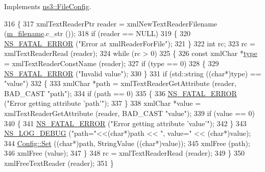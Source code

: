 Implements \hyperlink{classns3_1_1FileConfig_a2e56e049dfcc1c1378aca7e9cab58280}{ns3\+::\+File\+Config}.


\begin{DoxyCode}
316 \{
317   xmlTextReaderPtr reader = xmlNewTextReaderFilename (\hyperlink{classns3_1_1XmlConfigLoad_a8214344f421f9916919684829b0a129a}{m\_filename}.c\_str ());
318   \textcolor{keywordflow}{if} (reader == NULL)
319     \{
320       \hyperlink{group__fatal_ga5131d5e3f75d7d4cbfd706ac456fdc85}{NS\_FATAL\_ERROR} (\textcolor{stringliteral}{"Error at xmlReaderForFile"});
321     \}
322   \textcolor{keywordtype}{int} rc;
323   rc = xmlTextReaderRead (reader);
324   \textcolor{keywordflow}{while} (rc > 0)
325     \{
326       \textcolor{keyword}{const} xmlChar *\hyperlink{visualizer-ideas_8txt_add98db9e15e2a58cf2b57623e7aa893a}{type} = xmlTextReaderConstName (reader);
327       \textcolor{keywordflow}{if} (type == 0)
328         \{
329           \hyperlink{group__fatal_ga5131d5e3f75d7d4cbfd706ac456fdc85}{NS\_FATAL\_ERROR} (\textcolor{stringliteral}{"Invalid value"});
330         \}
331       \textcolor{keywordflow}{if} (std::string ((\textcolor{keywordtype}{char}*)type) == \textcolor{stringliteral}{"value"})
332         \{
333           xmlChar *path = xmlTextReaderGetAttribute (reader, BAD\_CAST \textcolor{stringliteral}{"path"});
334           \textcolor{keywordflow}{if} (path == 0)
335             \{
336               \hyperlink{group__fatal_ga5131d5e3f75d7d4cbfd706ac456fdc85}{NS\_FATAL\_ERROR} (\textcolor{stringliteral}{"Error getting attribute 'path'"});
337             \}
338           xmlChar *value = xmlTextReaderGetAttribute (reader, BAD\_CAST \textcolor{stringliteral}{"value"});
339           \textcolor{keywordflow}{if} (value == 0)
340             \{
341               \hyperlink{group__fatal_ga5131d5e3f75d7d4cbfd706ac456fdc85}{NS\_FATAL\_ERROR} (\textcolor{stringliteral}{"Error getting attribute 'value'"});
342             \}
343           \hyperlink{group__logging_ga413f1886406d49f59a6a0a89b77b4d0a}{NS\_LOG\_DEBUG} (\textcolor{stringliteral}{"path="}<<(\textcolor{keywordtype}{char}*)path << \textcolor{stringliteral}{", value="} << (\textcolor{keywordtype}{char}*)value);
344           \hyperlink{group__config_gadce03667ec621d64ce4aace85d9bcfd0}{Config::Set} ((\textcolor{keywordtype}{char}*)path, StringValue ((\textcolor{keywordtype}{char}*)value));
345           xmlFree (path);
346           xmlFree (value);
347         \}
348       rc = xmlTextReaderRead (reader);
349     \}
350   xmlFreeTextReader (reader);
351 \}
\end{DoxyCode}


